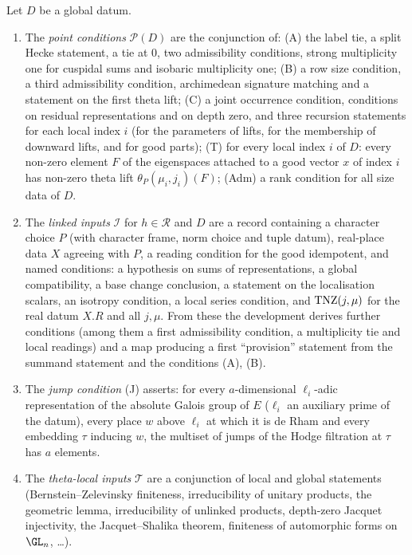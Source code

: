 \begin{definition}\label{pf:liftinj:pointdef}
Let $D$ be a global datum.
\begin{enumerate}[label=(\alph*)]
\item The \emph{point conditions} $\mathcal P(D)$ are the conjunction of:
(A) the label tie, a split Hecke statement, a tie at $0$, two admissibility conditions, strong multiplicity one for cuspidal sums and isobaric
multiplicity one;
(B) a row size condition, a third admissibility condition, archimedean signature matching and a statement on the first theta lift;
(C) a joint occurrence condition, conditions on residual representations and on depth zero, and three recursion statements for each local index $i$
(for the parameters of lifts, for the membership of downward lifts, and for good parts);
(T) for every local index $i$ of $D$: every non-zero element $F$ of the eigenspaces attached to a good vector $x$ of index $i$ has non-zero theta lift
$\theta_P(\mu_i,j_i)(F)$;
(Adm) a rank condition for all size data of $D$.
\item The \emph{linked inputs} $\mathcal I$ for $h\in\mathcal R$ and $D$ are a record containing a character choice $P$ (with character frame, norm choice
and tuple datum), real-place data $X$ agreeing with $P$, a reading condition for the good idempotent, and named conditions: a hypothesis on sums of
representations, a global compatibility, a base change conclusion, a statement on the localisation scalars, an isotropy condition, a local series
condition, and $\mathrm{TNZ}(j,\mu)$ for the real datum $X.R$ and all $j,\mu$. From these the development derives further conditions (among them a
first admissibility condition, a multiplicity tie and local readings) and a map producing a first ``provision'' statement from the summand statement
and the conditions (A), (B).
\item The \emph{jump condition} (J) asserts: for every $a$-dimensional $\ell_i$-adic representation of the absolute Galois group of $E$ ($\ell_i$ an
auxiliary prime of the datum), every place $w$ above $\ell_i$ at which it is de Rham and every embedding $\tau$ inducing $w$, the multiset of jumps of
the Hodge filtration at $\tau$ has $a$ elements.
\item The \emph{theta-local inputs} $\mathcal T$ are a conjunction of local and global statements (Bernstein--Zelevinsky finiteness, irreducibility of
unitary products, the geometric lemma, irreducibility of unlinked products, depth-zero Jacquet injectivity, the Jacquet--Shalika theorem, finiteness
of automorphic forms on $\GL_n$, \dots).
\end{enumerate}
\end{definition}

